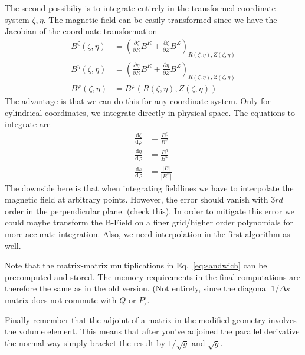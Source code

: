 \documentclass{hitec} %
\renewcommand{\d}{\mathrm{d}}
\begin{document}
The second possibiliy is to integrate entirely in the 
transformed coordinate system $\zeta, \eta$. 
The magnetic field can be easily transformed since we have the
Jacobian of the coordinate transformation
\begin{align}
    B^\zeta(\zeta, \eta) &= \left(\frac{\partial \zeta}{\partial R} B^{R} + \frac{\partial \zeta}{\partial Z}B^Z\right)_{R(\zeta, \eta), Z(\zeta, \eta)} \\
    B^\eta(\zeta, \eta) &= \left(\frac{\partial \eta}{\partial R} B^{R} + \frac{\partial \eta}{\partial Z}B^Z\right)_{R(\zeta, \eta), Z(\zeta, \eta)} \\
    B^\varphi(\zeta, \eta) &= B^\varphi({R(\zeta, \eta), Z(\zeta, \eta)})
    \label{eq:field_trafo}
\end{align}
The advantage is that we can do this for any coordinate
system. Only for cylindrical coordinates, we integrate directly in physical space. The equations to integrate
are
\begin{subequations}
\begin{align}
\frac{\d \zeta}{\d\varphi} &= \frac{B^\zeta}{B^\varphi}\\
\frac{\d \eta}{\d\varphi} &= \frac{B^\eta}{B^\varphi}\\
\frac{\d s}{\d\varphi} &= \frac{|B|}{|B^\varphi|}
\end{align}
\label{eq:fieldlines}
\end{subequations}
The downside here is that when integrating fieldlines we
have to interpolate the magnetic field at arbitrary points. 
However, the error should vanish with $3rd$ order in the 
perpendicular plane. (check this). In order to mitigate this error
we could maybe transform the B-Field on a finer grid/higher order polynomials for more accurate
integration. Also, we need interpolation in the 
first algorithm as well. 

Note that the matrix-matrix multiplications in Eq.~\eqref{eq:sandwich} can
be precomputed and stored. The memory requirements 
in the final computations are 
therefore the same  as in the old version. (Not entirely, since
the diagonal $1/\Delta s$ matrix does not commute with $Q$ or $P$).

Finally remember that the adjoint of a matrix in the modified geometry 
involves the volume element. This means that after you've adjoined the 
parallel derivative the normal way simply bracket the result 
by $1/\sqrt{g}$ and $\sqrt{g}$. 
\end{document}
